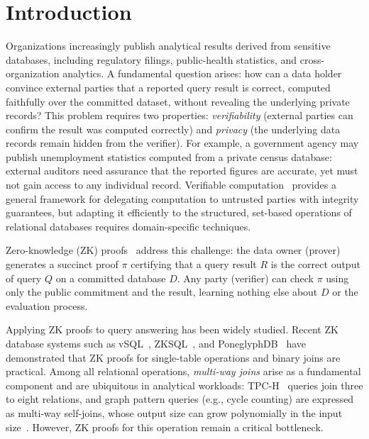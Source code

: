 \documentclass[sigconf]{acmart}
\renewcommand{\emph}[1]{\textit{#1}}
\begin{document}
\maketitle


\section{Introduction}

Organizations increasingly publish analytical results derived from sensitive databases, including regulatory filings, public-health statistics, and cross-organization analytics. A fundamental question arises: how can a data holder convince external parties that a reported query result is correct, computed faithfully over the committed dataset, without revealing the underlying private records? This problem requires two properties: \textit{verifiability} (external parties can confirm the result was computed correctly) and \textit{privacy} (the underlying data records remain hidden from the verifier).
For example, a government agency may publish unemployment statistics computed from a private census database: external auditors need assurance that the reported figures are accurate, yet must not gain access to any individual record. Verifiable computation~\cite{walfish2015verifying} provides a general framework for delegating computation to untrusted parties with integrity guarantees, but adapting it efficiently to the structured, set-based operations of relational databases requires domain-specific techniques.

Zero-knowledge (ZK) proofs~\cite{DBLP:conf/stoc/GoldwasserMR85} address this challenge: the data owner (prover) generates a succinct proof $\pi$ certifying that a query result $R$ is the correct output of query $Q$ on a committed database $D$. Any party (verifier) can check $\pi$ using only the public commitment and the result, learning nothing else about $D$ or the evaluation process.

Applying ZK proofs to query answering has been widely studied. Recent ZK database systems such as vSQL~\cite{zhang2017vsql,zhang2017zero}, ZKSQL~\cite{li2023zksql}, and PoneglyphDB~\cite{gu2025poneglyphdb} have demonstrated that ZK proofs for single-table operations and binary joins are practical. 
Among all relational operations, \emph{multi-way joins} arise as a fundamental component and are ubiquitous in analytical workloads: TPC-H~\cite{TPC-H2023} queries join three to eight relations, and graph pattern queries (e.g., cycle counting) are expressed as multi-way self-joins, whose output size can grow polynomially in the input size~\cite{atserias2013size, ngo2018worst}. However, ZK proofs for this operation remain a critical bottleneck.
\end{document}
